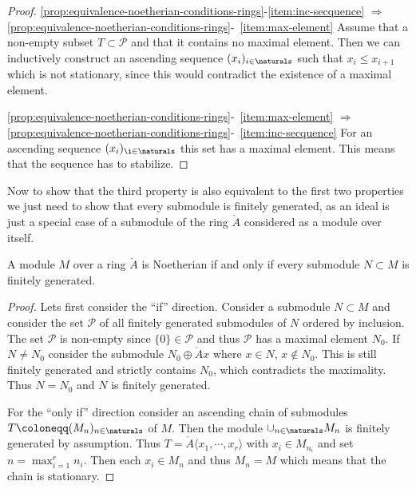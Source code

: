 \begin{proof}
  \autoref{prop:equivalence-noetherian-conditions-rings}-\ref{item:inc-secquence}
  $\Rightarrow$
  \autoref{prop:equivalence-noetherian-conditions-rings}-~\ref{item:max-element}
  Assume that a non-empty subset $T\subset \mathcal{P}$ and that it
  contains no maximal element. Then we can inductively construct an
  ascending sequence $(x_i)_{i\in \naturals}$ such that $x_i\leq
  x_{i+1}$ which is not stationary, since this would contradict the
  existence of a maximal element.

  \autoref{prop:equivalence-noetherian-conditions-rings}-~\ref{item:max-element}
  $\Rightarrow$
  \autoref{prop:equivalence-noetherian-conditions-rings}-~\ref{item:inc-secquence}
  For an ascending sequence $(x_i)_{\i\in \naturals}$ this set has a
  maximal element. This means that the sequence has to stabilize.
\end{proof}

Now to show that the third property is also equivalent to the first
two properties we just need to show that every submodule is finitely
generated, as an ideal is just a special case of a submodule of the
ring $\ring{A}$ considered as a module over itself.

\begin{proposition}
  \label{prop:submodules-of-noetherian-module-finitely-gernerated}
  A module $M$ over a ring $\ring{A}$ is Noetherian if and only if
  every submodule $N\subset M$ is finitely generated.
\end{proposition}

\begin{proof}
  Lets first consider the ``if'' direction. Consider a submodule $N
  \subset M$ and consider the set $\mathcal{P}$ of all finitely
  generated submodules of
  $N$ ordered by inclusion. The set $\mathcal{P}$ is non-empty since
  $\{0\}\in \mathcal{P}$ and thus $\mathcal{P}$ has a maximal element
  $N_0$. If $N\neq N_0$ consider the submodule $N_0\oplus \ring{A}x$
  where $x\in N$, $x\notin N_0$. This is still finitely generated and
  strictly contains $N_0$, which contradicts the maximality. Thus
  $N=N_0$ and $N$ is finitely generated.

  For the ``only if'' direction consider an ascending chain of
  submodules $T\coloneqq (M_n)_{n\in \naturals} $ of $M$. Then the module
  $\cup_{n\in \naturals} M_n$ is finitely generated by
  assumption. Thus $T = \ring{A}\langle x_1, \cdots , x_r\rangle$ with
  $x_i \in M_{n_i}$ and
  set $n=\max_{i=1}^r n_i$. Then each $x_i\in M_n$ and thus $M_n=M$
  which means that the chain is stationary. 
\end{proof}

